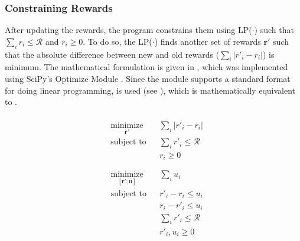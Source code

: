 \documentclass[12pt]{article}
\newcommand{\vect}[1]{\mathbf{#1}}  %
\begin{document}
    \subsubsection{Constraining Rewards} \label{sec:Constraining Rewards}
    After updating the rewards, the program constrains them using LP($\cdot$) such that $\sum_{i}r_i \leq \mathcal{R}$ and $r_i \geq 0$. To do so, the LP($\cdot$) finds another set of rewards $\vect{r'}$ such that the absolute difference between new and old rewards ($\sum_{i}|r'_i - r_i|$) is minimum. The mathematical formulation is given in , which was implemented using SciPy's Optimize Module \cite{SCPOptimizeDocs}. Since the module supports a standard format for doing linear programming,  is used (see ), which is mathematically equivalent to .
    \begin{multicols}{2}
        \begin{equation} \label{eqn:lp_math_constrain_rewards}
            \begin{aligned}\\
                & \underset{\vect{r'}}{\text{minimize}}
                & & \sum_{i}|r'_i - r_i|\\
                & \text{subject to}
                & & \sum_{i}r'_i \leq \mathcal{R}\\
                &&& r_i \geq 0\\ \\
            \end{aligned}
        \end{equation}\break
        \begin{equation} \label{eqn:lp_code_constrain_rewards}
            \begin{aligned}
                & \underset{[\vect{r'}, \vect{u}]}{\text{minimize}}
                & & \sum_{i} u_i\\
                & \text{subject to}
                & & r'_i - r_i \leq u_i\\
                &&& r_i - r'_i \leq u_i\\
                &&& \sum_{i} r'_i \leq \mathcal{R}\\
                &&& r'_i, u_i \geq 0
            \end{aligned}
        \end{equation}
    \end{multicols}
    
\end{document}
